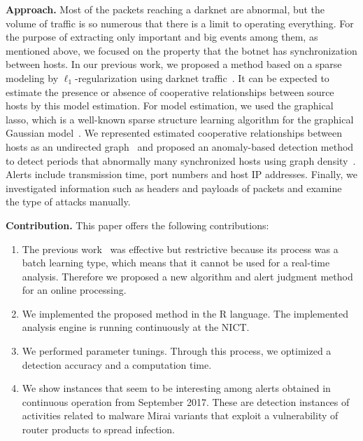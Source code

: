 \documentclass{sig-alternate-10pt}
\begin{document}
\vspace*{0.3 cm}
\noindent
\textbf{Approach.}\space\space
Most of the packets reaching a darknet are abnormal, but the volume of traffic is so numerous that there is a limit to operating everything.
For the purpose of extracting only important and big events among them, as mentioned above, we focused on the property that the botnet has synchronization between hosts.
In our previous work, we proposed a method based on a sparse modeling by $\ell_1$-regularization using darknet traffic~\cite{Hamasaki}.
It can be expected to estimate the presence or absence of cooperative relationships between source hosts by this model estimation.
For model estimation, we used the graphical lasso, which is a well-known sparse structure learning algorithm for the graphical Gaussian model~\cite{Friedman}.
We represented estimated cooperative relationships between hosts as an undirected graph~\cite{Mukai2} and proposed an anomaly-based detection method to detect periods that abnormally many synchronized hosts using graph density~\cite{Han}.
Alerts include transmission time, port numbers and host IP addresses.
Finally, we investigated information such as headers and payloads of packets and examine the type of attacks manually.


\vspace*{0.3 cm}
\noindent
\textbf{Contribution.}\space\space
This paper offers the following contributions:
\begin{enumerate}
	\item The previous work~\cite{Han} was effective but restrictive because its process was a batch learning type, which means that it cannot be used for a real-time analysis.
Therefore we proposed a new algorithm and alert judgment method for an online processing.

	\item We implemented the proposed method in the R language.
The implemented analysis engine is running continuously at the NICT.

	\item We performed parameter tunings.
Through this process, we optimized a detection accuracy and a computation time.

	\item We show instances that seem to be interesting among alerts obtained in continuous operation from September 2017. These are detection instances of activities related to malware Mirai variants that exploit a vulnerability of router products to spread infection.
\end{enumerate}
\end{document}
